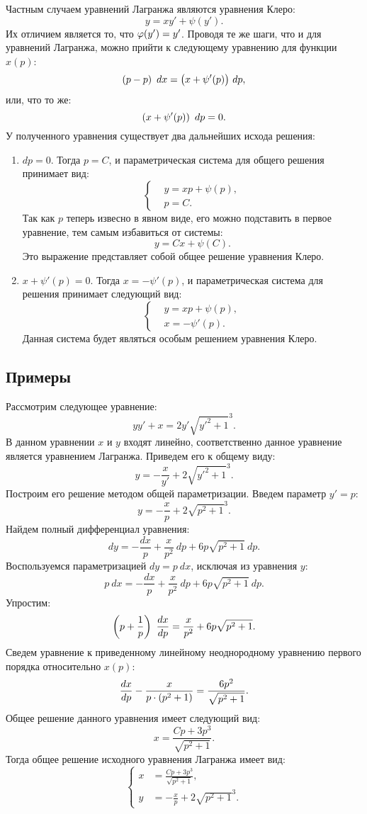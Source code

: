 	Частным случаем уравнений Лагранжа являются уравнения Клеро:
	\[ y = xy' + \psi(y'). \]
	Их отличием является то, что $\varphi(y') = y'$. Проводя те же шаги, что и для уравнений Лагранжа, можно прийти к следующему уравнению для функции $x(p)$:
	\[ \left( p - p \right) ~ dx = \bigl( x + \psi'(p) \bigr) ~ dp, \]
	или, что то же:
	\[ \left( x + \psi'(p) \right) ~ dp = 0. \]
	У полученного уравнения существует два дальнейших исхода решения:
	\begin{enumerate}
		\item $dp = 0$. Тогда $p = C$, и параметрическая система для общего решения принимает вид:
			\[ \left\lbrace \begin{split} &y = xp + \psi(p), \\ &p = C. \end{split} \right. \]
			Так как $p$ теперь извесно в явном виде, его можно подставить в первое уравнение, тем самым избавиться от системы:
			\[ y = Cx + \psi(C). \]
			Это выражение представляет собой общее решение уравнения Клеро.
		\item $x + \psi'(p) = 0$. Тогда $x = - \psi'(p)$, и параметрическая система для решения принимает следующий вид:
			\[ \left\lbrace \begin{split} &y = xp + \psi(p), \\ &x = - \psi'(p). \end{split} \right. \]
			Данная система будет являться особым решением уравнения Клеро.
	\end{enumerate}

	\subsection{Примеры}

		Рассмотрим следующее уравнение:
		\[ yy' + x = 2 y' \sqrt{y'^2 + 1}^3. \]
		В данном уравнении $x$ и $y$ входят линейно, соответственно данное уравнение является уравнением Лагранжа. Приведем его к общему виду:
		\[ y = - \frac{x}{y'} + 2 \sqrt{y'^2 + 1}^3. \]
		Построим его решение методом общей параметризации. Введем параметр $y' = p$:
		\[ y = - \frac{x}{p} + 2 \sqrt{p^2 + 1}^3. \]
		Найдем полный дифференциал уравнения:
		\[ dy = -\frac{dx}{p} + \frac{x}{p^2} ~ dp + 6p \sqrt{p^2 + 1} ~ dp. \]
		Воспользуемся параметризацией $dy = p ~ dx$, исключая из уравнения $y$:
		\[ p ~ dx = - \frac{dx}{p} + \frac{x}{p^2} ~ dp + 6p \sqrt{p^2 + 1} ~ dp. \]
		Упростим:
		\[ \left( p + \frac{1}{p} \right) ~ \dfrac{d x}{d p} = \frac{x}{p^2} + 6p \sqrt{p^2 + 1}. \]
		Сведем уравнение к приведенному линейному неоднородному уравнению первого порядка относительно $x(p)$:
		\[ \dfrac{d x}{d p} - \frac{x}{p \cdot \left( p^2 + 1 \right)} = \frac{6p^2 }{\sqrt{p^2 + 1}}. \]
		Общее решение данного уравнения имеет следующий вид:
		\[ x = \frac{Cp + 3p^3}{\sqrt{p^2 + 1}}. \]
		Тогда общее решение исходного уравнения Лагранжа имеет вид:
		\[ \left\lbrace \begin{split} 
			x &= \frac{Cp + 3p^3}{\sqrt{p^2 + 1}}, \\
			y &= - \frac{x}{p} + 2 \sqrt{p^2 + 1}^3.
		\end{split} \right. \]

